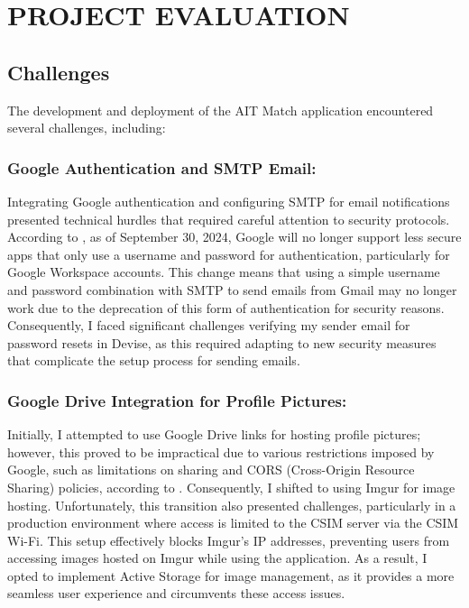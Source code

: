 \setlength{\footskip}{8mm}

\chapter{PROJECT EVALUATION}

\section{Challenges}
The development and deployment of the AIT Match application encountered several challenges, including:

    \subsection{Google Authentication and SMTP Email:} Integrating Google authentication and configuring SMTP for email notifications presented technical hurdles that required careful attention to security protocols. According to \cite{google_authentication}, as of September 30, 2024, Google will no longer support less secure apps that only use a username and password for authentication, particularly for Google Workspace accounts. This change means that using a simple username and password combination with SMTP to send emails from Gmail may no longer work due to the deprecation of this form of authentication for security reasons. Consequently, I faced significant challenges verifying my sender email for password resets in Devise, as this required adapting to new security measures that complicate the setup process for sending emails.
    
    \subsection{Google Drive Integration for Profile Pictures:}
    Initially, I attempted to use Google Drive links for hosting profile pictures; however, this proved to be impractical due to various restrictions imposed by Google, such as limitations on sharing and CORS (Cross-Origin Resource Sharing) policies, according to \cite{google_drive_restrictions}. Consequently, I shifted to using Imgur for image hosting. Unfortunately, this transition also presented challenges, particularly in a production environment where access is limited to the CSIM server via the CSIM Wi-Fi. This setup effectively blocks Imgur's IP addresses, preventing users from accessing images hosted on Imgur while using the application. As a result, I opted to implement Active Storage for image management, as it provides a more seamless user experience and circumvents these access issues.

